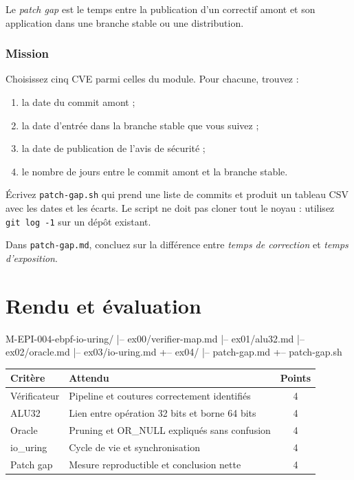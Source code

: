 \documentclass{training}
\begin{document}
Le \emph{patch gap} est le temps entre la publication d'un correctif amont
et son application dans une branche stable ou une distribution.

\subsection*{Mission}

Choisissez cinq CVE parmi celles du module. Pour chacune, trouvez :

\begin{enumerate}
  \item la date du commit amont ;
  \item la date d'entrée dans la branche stable que vous suivez ;
  \item la date de publication de l'avis de sécurité ;
  \item le nombre de jours entre le commit amont et la branche stable.
\end{enumerate}

Écrivez \texttt{patch-gap.sh} qui prend une liste de commits et produit un
tableau CSV avec les dates et les écarts. Le script ne doit pas cloner tout
le noyau : utilisez \texttt{git log -1} sur un dépôt existant.

Dans \texttt{patch-gap.md}, concluez sur la différence entre \emph{temps de
correction} et \emph{temps d'exposition}.

\chapter{Rendu et évaluation}

\begin{console}
M-EPI-004-ebpf-io-uring/
|-- ex00/verifier-map.md
|-- ex01/alu32.md
|-- ex02/oracle.md
|-- ex03/io-uring.md
+-- ex04/
    |-- patch-gap.md
    +-- patch-gap.sh
\end{console}

\begin{center}
\begin{tabularx}{\linewidth}{|l|X|c|}
\hline
\textbf{Critère} & \textbf{Attendu} & \textbf{Points} \\ \hline
Vérificateur & Pipeline et coutures correctement identifiés & 4 \\ \hline
ALU32 & Lien entre opération 32 bits et borne 64 bits & 4 \\ \hline
Oracle & Pruning et OR\_NULL expliqués sans confusion & 4 \\ \hline
io\_uring & Cycle de vie et synchronisation & 4 \\ \hline
Patch gap & Mesure reproductible et conclusion nette & 4 \\ \hline
\end{tabularx}
\end{center}
\end{document}
